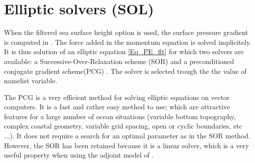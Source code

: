 \section{Elliptic solvers (SOL)}
\label{MISC_sol}

When the filtered sea surface height option is used, the surface pressure gradient is 
computed in . The force added in the momentum equation is solved implicitely.
It is thus solution of an elliptic equation \eqref{Eq_PE_flt} for which two solvers are available: 
a Successive-Over-Relaxation scheme (SOR) and a preconditioned conjugate gradient 
scheme(PCG) \citep{Madec_al_OM88, Madec_PhD90}. The solver is selected trough the
the value of     namelist variable. 

The PCG is a very efficient method for solving elliptic equations on vector computers. 
It is a fast and rather easy method to use; which are attractive features for a large 
number of ocean situations (variable bottom topography, complex coastal geometry, 
variable grid spacing, open or cyclic boundaries, etc ...). It does not require 
a search for an optimal parameter as in the SOR method. However, the SOR has 
been retained because it is a linear solver, which is a very useful property when 
using the adjoint model of \NEMO.

